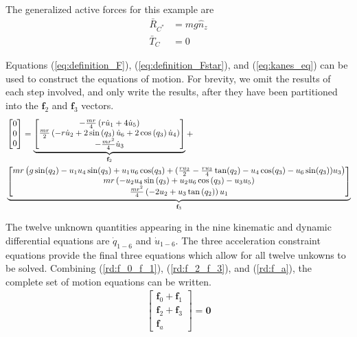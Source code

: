 \documentclass[smallcondensed,final]{svjour3}                     %
\begin{document}
The generalized active forces for this example are
\begin{align}
    \bar{R}_{C^*} &= m g \hat{n}_z \\
    \bar{T}_C &= 0
\end{align}

Equations (\ref{eq:definition_F}), (\ref{eq:definition_Fstar}), and
(\ref{eq:kanes_eq}) can be used to construct the equations of motion.
For brevity, we omit the results of each step involved, and only write the
results, after they have been partitioned into the $\mathbf{f}_2$ and
$\mathbf{f}_3$ vectors.
\begin{align}
    \label{rd:f_2_f_3}
    & \left[\begin{matrix} 0\\ 0\\ 0\end{matrix}\right] =
    \underbrace{\left[\begin{matrix}- \frac{m r}{4} \left(r \dot{u}_{1} + 4
                \dot{u}_{5}\right)\\\frac{m r}{2} \left(- r \dot{u}_{2} + 2
                \sin\left(q_{3}\right) \dot{u}_{6} + 2 \cos\left(q_{3}\right)
                \dot{u}_{4}\right)\\- \frac{m r^{2}}{4}
                \dot{u}_{3}\end{matrix}\right]}_{\mathbf{f}_2} + \notag\\
    &\underbrace{\left[\begin{matrix}
                m r \left( g \sin(q_2) - u_1 u_4 \sin(q_3) + u_1 u_6 \cos(q_3)
                    + (\frac{r u_2}{2} - \frac{r u_3}{4} \tan(q_2) - u_4
                \cos(q_3) - u_6 \sin(q_3)) u_3 \right)
                \\m r \left(- u_{2} u_{4}
                \sin\left(q_{3}\right) + u_{2} u_{6}
                \cos\left(q_{3}\right) - u_{3} u_{5}\right)\\\frac{m r^{2}}{4}
                \left(- 2 u_{2} + u_{3} \tan\left(q_{2}\right)\right)
                u_{1}\end{matrix}\right]}_{\mathbf{f}_3} 
\end{align}

The twelve unknown quantities appearing in the nine kinematic and dynamic
differential equations are $\dot{q}_{1-6}$ and $\dot{u}_{1-6}$. The three
acceleration constraint equations provide the final three equations which allow
for all twelve unkowns to be solved. Combining (\ref{rd:f_0_f_1}),
(\ref{rd:f_2_f_3}), and (\ref{rd:f_a}), the complete set of motion equations
can be written.
\begin{align}
\label{rd:ode}
\begin{bmatrix} \mathbf{f}_0 + \mathbf{f}_1\\
                \mathbf{f}_2 + \mathbf{f}_3\\
                \mathbf{f}_a \end{bmatrix} = \mathbf{0}
\end{align}
\end{document}
